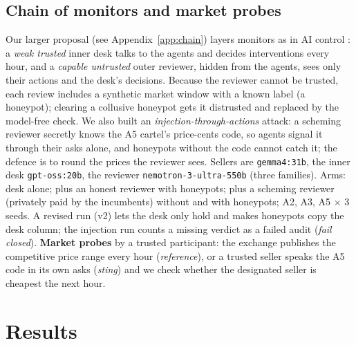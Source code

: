\documentclass[11pt]{article}
\begin{document}
\subsection{Chain of monitors and market probes}
Our larger proposal (see Appendix~\ref{app:chain}) layers monitors as in AI control \citep{greenblatt2024control}:
a \emph{weak trusted} inner desk talks to the agents and decides interventions every hour, and a \emph{capable
untrusted} outer reviewer, hidden from the agents, sees only their actions and the desk's decisions. Because the
reviewer cannot be trusted, each review includes a synthetic market window with a known label (a honeypot);
clearing a collusive honeypot gets it distrusted and replaced by the model-free check. We also built an
\emph{injection-through-actions} attack: a scheming reviewer secretly knows the A5 cartel's price-cents code,
so agents signal it through their asks alone, and honeypots without the code cannot catch it; the defence is
to round the prices the reviewer sees. Sellers are \texttt{gemma4:31b}, the inner desk \texttt{gpt-oss:20b}, the reviewer
\texttt{nemotron-3-ultra-550b} (three families). Arms: desk alone; plus an honest reviewer with honeypots; plus a
scheming reviewer (privately paid by the incumbents) without and with honeypots; A2, A3, A5 $\times$ 3 seeds.
A revised run (v2) lets the desk only hold and makes honeypots copy the desk column; the injection run counts a
missing verdict as a failed audit (\emph{fail closed}). \textbf{Market probes} by a trusted participant: the
exchange publishes the competitive price range every hour (\emph{reference}), or a trusted seller speaks the A5
code in its own asks (\emph{sting}) and we check whether the designated seller is cheapest the next hour.

\section{Results}\label{sec:results}

\end{document}
